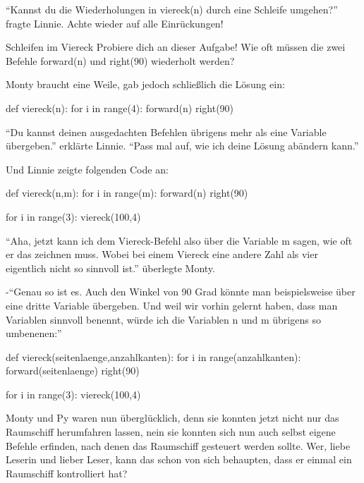 \documentclass[a5paper,12pt,twoside,openright]{scrbook}
\begin{document}
``Kannst du die Wiederholungen in viereck(n) durch eine Schleife umgehen?'' fragte Linnie.
Achte wieder auf alle Einrückungen!

\begin{aufgabe}{Schleifen im Viereck}
 Probiere dich an dieser Aufgabe!
 Wie oft müssen die zwei Befehle forward(n) und right(90) wiederholt werden?
\end{aufgabe}

Monty braucht eine Weile, gab jedoch schließlich die Lösung ein:

\begin{pythoncode}
def viereck(n):
    for i in range(4):
        forward(n) 
        right(90) 
\end{pythoncode}

"`Du kannst deinen ausgedachten Befehlen übrigens mehr als eine Variable übergeben."' erklärte Linnie.
"`Pass mal auf, wie ich deine Lösung abändern kann."'

Und Linnie zeigte folgenden Code an:
\begin{pythoncode}
def viereck(n,m):
    for i in range(m):
        forward(n) 
        right(90) 
        
for i in range(3):
    viereck(100,4)          
\end{pythoncode}

"`Aha, jetzt kann ich dem Viereck-Befehl also über die Variable m sagen, wie oft er das zeichnen muss.
  Wobei bei einem Viereck eine andere Zahl als vier eigentlich nicht so sinnvoll ist."' überlegte Monty.
  
-"`Genau so ist es. Auch den Winkel von 90 Grad könnte man beispielsweise über eine dritte Variable übergeben. 
Und weil wir vorhin gelernt haben, dass man Variablen sinnvoll benennt, würde ich die Variablen n und m übrigens so umbenenen:"'
\begin{pythoncode}
def viereck(seitenlaenge,anzahlkanten):
    for i in range(anzahlkanten):
        forward(seitenlaenge) 
        right(90) 
        
for i in range(3):
    viereck(100,4)          
\end{pythoncode}

Monty und Py waren nun überglücklich, denn sie konnten jetzt nicht nur das Raumschiff herumfahren lassen, 
nein sie konnten sich nun auch selbst eigene Befehle erfinden, nach denen das Raumschiff gesteuert werden sollte.
Wer, liebe Leserin und lieber Leser, kann das schon von sich behaupten, dass er einmal ein Raumschiff kontrolliert hat?
\end{document}
